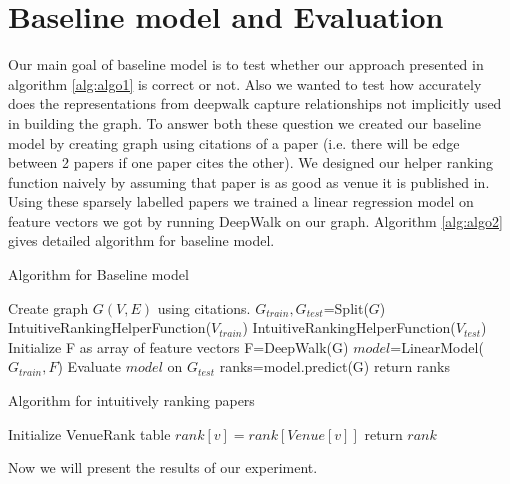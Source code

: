 \documentclass[a4paper, 11pt]{article}
\begin{document}
\section{Baseline model and Evaluation}
Our main goal of baseline model is to test whether our approach presented in algorithm \ref{alg:algo1} is correct or not. Also we wanted to test how accurately does the representations from deepwalk capture relationships not implicitly used in building the graph. To answer both these question we created our baseline model by creating graph using citations of a paper (i.e. there will be edge between 2 papers if one paper cites the other). We designed our helper ranking function naively by assuming that paper is as good as venue it is published in. Using these sparsely labelled papers we trained a linear regression model on feature vectors we got by running DeepWalk on our graph. Algorithm \ref{alg:algo2} gives detailed algorithm for baseline model.
\begin{algorithm}
\caption{Algorithm for Baseline model}
\label{alg:algo2}
\begin{algorithmic}[1]
\State Create graph $G(V,E)$ using citations.
\State $G_{train}, G_{test}$=Split($G$) 
\State IntuitiveRankingHelperFunction($V_{train}$)
\State IntuitiveRankingHelperFunction($V_{test}$)
\State Initialize F as array of feature vectors
\State F=DeepWalk(G) 
\State $model$=LinearModel($G_{train},F$)
\State Evaluate  $model$ on $G_{test}$
\State ranks=model.predict(G)
\State return ranks
\end{algorithmic}
\end{algorithm}
\begin{algorithm}
\caption{Algorithm for intuitively ranking papers}
\label{alg:algo3}
\begin{algorithmic}[1]
\State Initialize VenueRank table 
	\State $rank[v]=rank[Venue[v]]$ 
\EndFor
\State return $rank$
\EndProcedure
\end{algorithmic}
\end{algorithm}

Now we will present the results of our experiment. 
\end{document}
